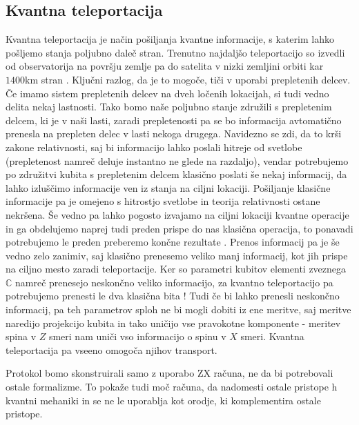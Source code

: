 \documentclass[mat1]{fmfdelo}
\newcommand{\C}{\mathbb C}
\begin{document}
\subsection{Kvantna teleportacija}
Kvantna teleportacija je način pošiljanja kvantne informacije, s katerim lahko pošljemo stanja poljubno daleč stran. Trenutno najdaljšo teleportacijo so izvedli od observatorija na površju zemlje pa do satelita v nizki zemljini orbiti kar \(1400\unit{\kilo\metre}\) stran \cite{Ren2017}. Ključni razlog, da je to mogoče, tiči v uporabi prepletenih delcev. Če imamo sistem prepletenih delcev na dveh ločenih lokacijah, si tudi vedno delita nekaj lastnosti. Tako bomo naše poljubno stanje združili s prepletenim delcem, ki je v naši lasti, zaradi prepletenosti pa se bo informacija avtomatično prenesla na prepleten delec v lasti nekoga drugega. Navidezno se zdi, da to krši zakone relativnosti, saj bi informacijo lahko poslali hitreje od svetlobe (prepletenost namreč deluje instantno ne glede na razdaljo), vendar potrebujemo po združitvi kubita s prepletenim delcem klasično poslati še nekaj informacij, da lahko izluščimo informacije ven iz stanja na ciljni lokaciji. Pošiljanje klasične informacije pa je omejeno s hitrostjo svetlobe in teorija relativnosti ostane nekršena. Še vedno pa lahko pogosto izvajamo na ciljni lokaciji kvantne operacije in ga obdelujemo naprej tudi preden prispe do nas klasična operacija, to ponavadi potrebujemo le preden preberemo končne rezultate \cite[Poglavje 4.13]{zidko}. Prenos informacij pa je še vedno zelo zanimiv, saj klasično prenesemo veliko manj informacij, kot jih prispe na ciljno mesto zaradi teleportacije. Ker so parametri kubitov elementi zveznega \(\C\) namreč prenesejo neskončno veliko informacijo, za kvantno teleportacijo pa potrebujemo prenesti le dva klasična bita \cite[Poglavje 1.3.7]{nielsen}! Tudi če bi lahko prenesli neskončno informacij, pa teh parametrov sploh ne bi mogli dobiti iz ene meritve, saj meritve naredijo projekcijo kubita in tako uničijo vse pravokotne komponente - meritev spina v \(Z\) smeri nam uniči vso informacijo o spinu v \(X\) smeri. Kvantna teleportacija pa vseeno omogoča njihov transport.

Protokol bomo skonstruirali samo z uporabo ZX računa, ne da bi potrebovali ostale formalizme. To pokaže tudi moč računa, da nadomesti ostale pristope h kvantni mehaniki in se ne le uporablja kot orodje, ki komplementira ostale pristope.
\end{document}
